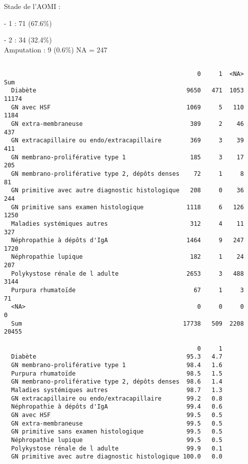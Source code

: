 \documentclass[11pt,a4paper]{article}\usepackage[]{graphicx}\usepackage[]{color}
\makeatletter
\newenvironment{kframe}{%
 \def\at@end@of@kframe{}%
 \ifinner\ifhmode%
  \def\at@end@of@kframe{\end{minipage}}%
  \begin{minipage}{\columnwidth}%
 \fi\fi%
 \def\FrameCommand##1{\hskip\@totalleftmargin \hskip-\fboxsep
 \colorbox{shadecolor}{##1}\hskip-\fboxsep
     \hskip-\linewidth \hskip-\@totalleftmargin \hskip\columnwidth}%
 \MakeFramed {\advance\hsize-\width
   \@totalleftmargin\z@ \linewidth\hsize
   \@setminipage}}%
 {\par\unskip\endMakeFramed%
 \at@end@of@kframe}
\newenvironment{knitrout}{}{} %
\makeatother
\begin{document}
Stade de l’AOMI : 

- 1 : 71 (67.6\%)

- 2 : 34 (32.4\%)
~\\

Amputation : 9 (0.6\%) NA = 247

\begin{knitrout}
\color{fgcolor}\begin{kframe}
\begin{verbatim}
                                                 
                                                      0     1  <NA>   Sum
  Diabète                                          9650   471  1053 11174
  GN avec HSF                                      1069     5   110  1184
  GN extra-membraneuse                              389     2    46   437
  GN extracapillaire ou endo/extracapillaire        369     3    39   411
  GN membrano-proliférative type 1                  185     3    17   205
  GN membrano-proliférative type 2, dépôts denses    72     1     8    81
  GN primitive avec autre diagnostic histologique   208     0    36   244
  GN primitive sans examen histologique            1118     6   126  1250
  Maladies systémiques autres                       312     4    11   327
  Néphropathie à dépôts d'IgA                      1464     9   247  1720
  Néphropathie lupique                              182     1    24   207
  Polykystose rénale de l adulte                   2653     3   488  3144
  Purpura rhumatoïde                                 67     1     3    71
  <NA>                                                0     0     0     0
  Sum                                             17738   509  2208 20455
                                                 
                                                      0     1
  Diabète                                          95.3   4.7
  GN membrano-proliférative type 1                 98.4   1.6
  Purpura rhumatoïde                               98.5   1.5
  GN membrano-proliférative type 2, dépôts denses  98.6   1.4
  Maladies systémiques autres                      98.7   1.3
  GN extracapillaire ou endo/extracapillaire       99.2   0.8
  Néphropathie à dépôts d'IgA                      99.4   0.6
  GN avec HSF                                      99.5   0.5
  GN extra-membraneuse                             99.5   0.5
  GN primitive sans examen histologique            99.5   0.5
  Néphropathie lupique                             99.5   0.5
  Polykystose rénale de l adulte                   99.9   0.1
  GN primitive avec autre diagnostic histologique 100.0   0.0
\end{verbatim}
\end{kframe}
\end{knitrout}
~\\
\end{document}
